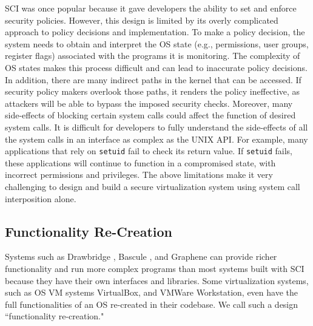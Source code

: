 SCI was once popular
because it gave developers the ability to set and enforce security policies.
However, this design is limited by its overly complicated approach to policy
decisions and implementation.
To make a policy decision, the system needs to
obtain and interpret the OS state (e.g., permissions, user groups, register flags)
associated with the programs it is monitoring.
The complexity of OS states makes this process difficult and can lead to
inaccurate policy decisions.
In addition, there are many indirect paths in the kernel that can be accessed.
If security policy makers overlook those paths, it renders the
policy ineffective, as attackers will be able to
bypass the imposed security checks.
Moreover, many side-effects of blocking
certain system calls could affect the function of desired system calls.
It is difficult for developers to fully understand the side-effects of all the
system calls in an interface as complex as the UNIX API.
For example, many applications that rely on \texttt{setuid} fail to check its return value.
If \texttt{setuid} fails, these applications will continue to function in a compromised state,
with incorrect permissions and privileges.
The above limitations make it very challenging to design and build a secure virtualization system using
system call interposition alone.

\subsection{Functionality Re-Creation}
Systems such as  Drawbridge \cite{Drawbridge-11},
 Bascule \cite{Bascule}, and Graphene \cite{Graphene-14} can
provide richer functionality and run more complex programs than most systems built
with SCI because they have their own
interfaces and libraries. Some virtualization
systems, such as OS VM systems VirtualBox, and VMWare Workstation, even have the
full functionalities of an OS re-created in their codebase. We call such a design
``functionality re-creation."

